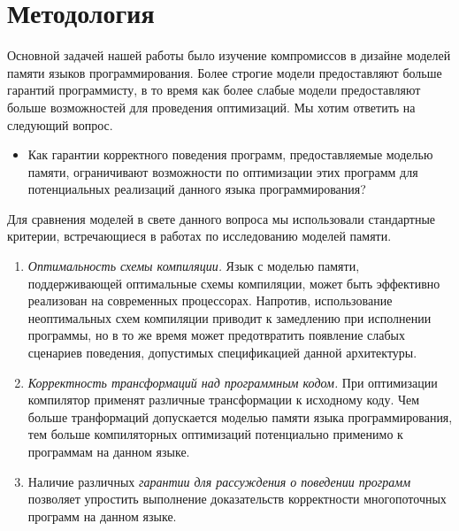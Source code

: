 \section{Методология}
\label{sec:methodology}

Основной задачей нашей работы было изучение
компромиссов в дизайне моделей памяти 
языков программирования. 
Более строгие модели предоставляют больше гарантий программисту,
в то время как более слабые модели предоставляют 
больше возможностей для проведения оптимизаций. 
Мы хотим ответить на следующий вопрос. 

\begin{itemize}
  \item Как гарантии  корректного поведения программ, 
    предоставляемые моделью памяти, ограничивают возможности 
    по оптимизации этих программ для потенциальных реализаций
    данного языка программирования?
\end{itemize}

Для сравнения моделей в свете данного вопроса мы использовали стандартные критерии,
встречающиеся в работах по исследованию моделей памяти. 

\begin{enumerate}[label=\textbf{C.\arabic*}]
  
  \item \label{item:criteria:opt-comp}
    \emph{Оптимальность схемы компиляции.}
    Язык с моделью памяти, поддерживающей оптимальные 
    схемы компиляции, может быть эффективно реализован
    на современных процессорах. 
    Напротив, использование неоптимальных схем компиляции
    приводит к замедлению при исполнении программы, 
    но в то же время может предотвратить появление 
    слабых сценариев поведения, допустимых спецификацией данной архитектуры. 

  \item \label{item:criteria:sound-trans}
    \emph{Корректность трансформаций над программным кодом.} 
    При оптимизации компилятор
    применят различные трансформации к исходному коду. 
    Чем больше транформаций допускается моделью памяти языка программирования, 
    тем больше компиляторных оптимизаций потенциально применимо 
    к программам на данном языке. 

  \item \label{item:criteria:reasoning}
    Наличие  различных \emph{гарантии для рассуждения о поведении программ}
    позволяет упростить  выполнение доказательств  корректности 
    многопоточных программ  на данном языке. 
  
\end{enumerate}

